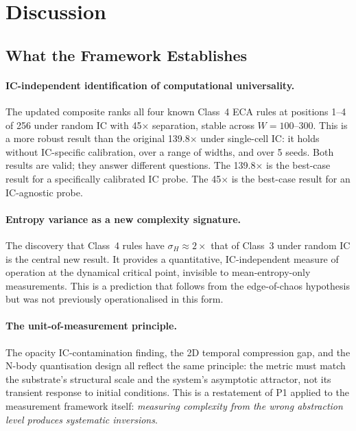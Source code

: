 \documentclass[12pt,a4paper]{article}
\begin{document}
\section{Discussion}

\subsection{What the Framework Establishes}

\paragraph{IC-independent identification of computational universality.}
The updated composite ranks all four known Class~4 ECA rules at positions 1--4
of 256 under random IC with 45$\times$ separation, stable across
$W = 100$--$300$.
This is a more robust result than the original 139.8$\times$ under single-cell IC:
it holds without IC-specific calibration, over a range of widths, and over
5 seeds.
Both results are valid; they answer different questions.
The 139.8$\times$ is the best-case result for a specifically calibrated IC probe.
The 45$\times$ is the best-case result for an IC-agnostic probe.

\paragraph{Entropy variance as a new complexity signature.}
The discovery that Class~4 rules have $\sigma_H \approx 2\times$ that of
Class~3 under random IC is the central new result.
It provides a quantitative, IC-independent measure of operation at the
dynamical critical point, invisible to mean-entropy-only measurements.
This is a prediction that follows from the edge-of-chaos hypothesis
\citep{langton1990} but was not previously operationalised in this form.

\paragraph{The unit-of-measurement principle.}
The opacity IC-contamination finding, the 2D temporal compression gap,
and the N-body quantisation design all reflect the same principle:
the metric must match the substrate's structural scale and the system's
asymptotic attractor, not its transient response to initial conditions.
This is a restatement of P1 applied to the measurement framework itself:
\emph{measuring complexity from the wrong abstraction level produces systematic
inversions}.
\end{document}
